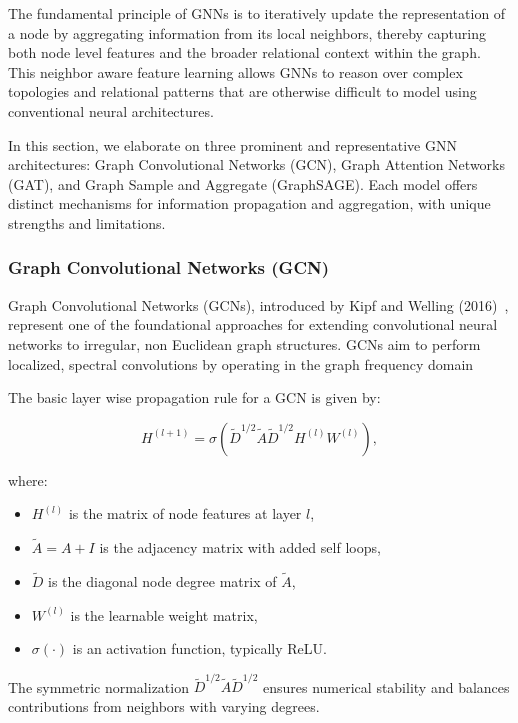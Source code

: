 \documentclass{article}
\begin{document}
The fundamental principle of GNNs is to iteratively update the representation of a node by aggregating information from its local neighbors, thereby capturing both node level features and the broader relational context within the graph. This neighbor aware feature learning allows GNNs to reason over complex topologies and relational patterns that are otherwise difficult to model using conventional neural architectures.

In this section, we elaborate on three prominent and representative GNN architectures: Graph Convolutional Networks (GCN), Graph Attention Networks (GAT), and Graph Sample and Aggregate (GraphSAGE). Each model offers distinct mechanisms for information propagation and aggregation, with unique strengths and limitations.

\subsubsection{Graph Convolutional Networks (GCN)}

Graph Convolutional Networks (GCNs), introduced by Kipf and Welling (2016)~\cite{kipf_2017_semisupervised}, represent one of the foundational approaches for extending convolutional neural networks to irregular, non Euclidean graph structures. GCNs aim to perform localized, spectral convolutions by operating in the graph frequency domain

The basic layer wise propagation rule for a GCN is given by:

\[
H^{(l+1)} = \sigma\left( \tilde{D}^{ 1/2} \tilde{A} \tilde{D}^{ 1/2} H^{(l)} W^{(l)} \right),
\]

where:
\begin{itemize}
    \item \(H^{(l)}\) is the matrix of node features at layer \(l\),
    \item \(\tilde{A} = A + I\) is the adjacency matrix with added self loops,
    \item \(\tilde{D}\) is the diagonal node degree matrix of \(\tilde{A}\),
    \item \(W^{(l)}\) is the learnable weight matrix,
    \item \(\sigma(\cdot)\) is an activation function, typically ReLU.
\end{itemize}

The symmetric normalization \(\tilde{D}^{ 1/2} \tilde{A} \tilde{D}^{ 1/2}\) ensures numerical stability and balances contributions from neighbors with varying degrees.
\end{document}
